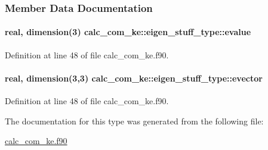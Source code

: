\subsubsection{Member Data Documentation}
\hypertarget{structcalc__com__ke_1_1eigen__stuff__type_adc6524cb29363130d50b57a28eca3453}{
\paragraph[{evalue}]{\setlength{\rightskip}{0pt plus 5cm}real, dimension(3) calc\-\_\-com\-\_\-ke\-::eigen\-\_\-stuff\-\_\-type\-::evalue}}\label{structcalc__com__ke_1_1eigen__stuff__type_adc6524cb29363130d50b57a28eca3453}


Definition at line 48 of file calc\-\_\-com\-\_\-ke.\-f90.

\hypertarget{structcalc__com__ke_1_1eigen__stuff__type_a564110e1063d7391ad7e0a674aee4842}{
\paragraph[{evector}]{\setlength{\rightskip}{0pt plus 5cm}real, dimension(3,3) calc\-\_\-com\-\_\-ke\-::eigen\-\_\-stuff\-\_\-type\-::evector}}\label{structcalc__com__ke_1_1eigen__stuff__type_a564110e1063d7391ad7e0a674aee4842}


Definition at line 48 of file calc\-\_\-com\-\_\-ke.\-f90.



The documentation for this type was generated from the following file\-:\begin{DoxyCompactItemize}
\item 
\hyperlink{calc__com__ke_8f90}{calc\-\_\-com\-\_\-ke.\-f90}\end{DoxyCompactItemize}
